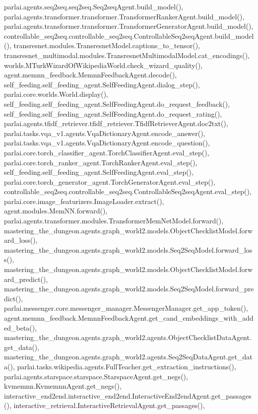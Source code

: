 parlai.\+agents.\+seq2seq.\+seq2seq.\+Seq2seq\+Agent.\+build\+\_\+model(), parlai.\+agents.\+transformer.\+transformer.\+Transformer\+Ranker\+Agent.\+build\+\_\+model(), parlai.\+agents.\+transformer.\+transformer.\+Transformer\+Generator\+Agent.\+build\+\_\+model(), controllable\+\_\+seq2seq.\+controllable\+\_\+seq2seq.\+Controllable\+Seq2seq\+Agent.\+build\+\_\+model(), transresnet.\+modules.\+Transresnet\+Model.\+captions\+\_\+to\+\_\+tensor(), transresnet\+\_\+multimodal.\+modules.\+Transresnet\+Multimodal\+Model.\+cat\+\_\+encodings(), worlds.\+M\+Turk\+Wizard\+Of\+Wikipedia\+World.\+check\+\_\+wizard\+\_\+quality(), agent.\+memnn\+\_\+feedback.\+Memnn\+Feedback\+Agent.\+decode(), self\+\_\+feeding.\+self\+\_\+feeding\+\_\+agent.\+Self\+Feeding\+Agent.\+dialog\+\_\+step(), parlai.\+core.\+worlds.\+World.\+display(), self\+\_\+feeding.\+self\+\_\+feeding\+\_\+agent.\+Self\+Feeding\+Agent.\+do\+\_\+request\+\_\+feedback(), self\+\_\+feeding.\+self\+\_\+feeding\+\_\+agent.\+Self\+Feeding\+Agent.\+do\+\_\+request\+\_\+rating(), parlai.\+agents.\+tfidf\+\_\+retriever.\+tfidf\+\_\+retriever.\+Tfidf\+Retriever\+Agent.\+doc2txt(), parlai.\+tasks.\+vqa\+\_\+v1.\+agents.\+Vqa\+Dictionary\+Agent.\+encode\+\_\+answer(), parlai.\+tasks.\+vqa\+\_\+v1.\+agents.\+Vqa\+Dictionary\+Agent.\+encode\+\_\+question(), parlai.\+core.\+torch\+\_\+classifier\+\_\+agent.\+Torch\+Classifier\+Agent.\+eval\+\_\+step(), parlai.\+core.\+torch\+\_\+ranker\+\_\+agent.\+Torch\+Ranker\+Agent.\+eval\+\_\+step(), self\+\_\+feeding.\+self\+\_\+feeding\+\_\+agent.\+Self\+Feeding\+Agent.\+eval\+\_\+step(), parlai.\+core.\+torch\+\_\+generator\+\_\+agent.\+Torch\+Generator\+Agent.\+eval\+\_\+step(), controllable\+\_\+seq2seq.\+controllable\+\_\+seq2seq.\+Controllable\+Seq2seq\+Agent.\+eval\+\_\+step(), parlai.\+core.\+image\+\_\+featurizers.\+Image\+Loader.\+extract(), agent.\+modules.\+Mem\+N\+N.\+forward(), parlai.\+agents.\+transformer.\+modules.\+Transformer\+Mem\+Net\+Model.\+forward(), mastering\+\_\+the\+\_\+dungeon.\+agents.\+graph\+\_\+world2.\+models.\+Object\+Checklist\+Model.\+forward\+\_\+loss(), mastering\+\_\+the\+\_\+dungeon.\+agents.\+graph\+\_\+world2.\+models.\+Seq2\+Seq\+Model.\+forward\+\_\+loss(), mastering\+\_\+the\+\_\+dungeon.\+agents.\+graph\+\_\+world2.\+models.\+Object\+Checklist\+Model.\+forward\+\_\+predict(), mastering\+\_\+the\+\_\+dungeon.\+agents.\+graph\+\_\+world2.\+models.\+Seq2\+Seq\+Model.\+forward\+\_\+predict(), parlai.\+messenger.\+core.\+messenger\+\_\+manager.\+Messenger\+Manager.\+get\+\_\+app\+\_\+token(), agent.\+memnn\+\_\+feedback.\+Memnn\+Feedback\+Agent.\+get\+\_\+cand\+\_\+embeddings\+\_\+with\+\_\+added\+\_\+beta(), mastering\+\_\+the\+\_\+dungeon.\+agents.\+graph\+\_\+world2.\+agents.\+Object\+Checklist\+Data\+Agent.\+get\+\_\+data(), mastering\+\_\+the\+\_\+dungeon.\+agents.\+graph\+\_\+world2.\+agents.\+Seq2\+Seq\+Data\+Agent.\+get\+\_\+data(), parlai.\+tasks.\+wikipedia.\+agents.\+Full\+Teacher.\+get\+\_\+extraction\+\_\+instructions(), parlai.\+agents.\+starspace.\+starspace.\+Starspace\+Agent.\+get\+\_\+negs(), kvmemnn.\+Kvmemnn\+Agent.\+get\+\_\+negs(), interactive\+\_\+end2end.\+interactive\+\_\+end2end.\+Interactive\+End2end\+Agent.\+get\+\_\+passages(), interactive\+\_\+retrieval.\+Interactive\+Retrieval\+Agent.\+get\+\_\+passages(), 